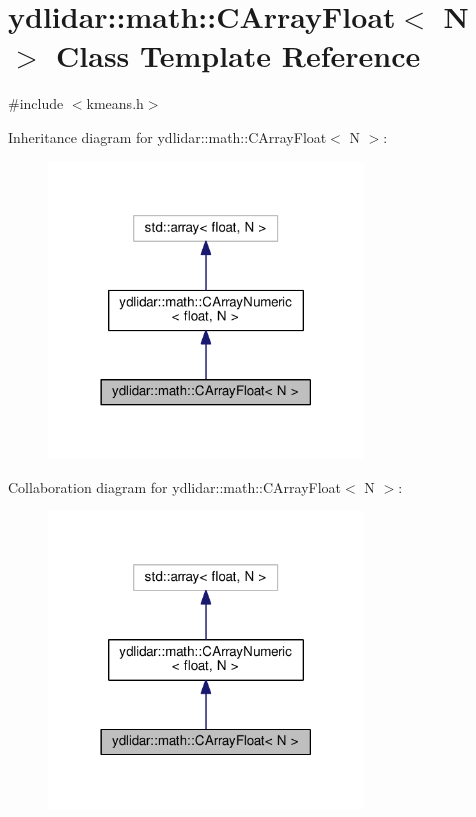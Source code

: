 \hypertarget{classydlidar_1_1math_1_1_c_array_float}{}\section{ydlidar\+:\+:math\+:\+:C\+Array\+Float$<$ N $>$ Class Template Reference}
\label{classydlidar_1_1math_1_1_c_array_float}


{\ttfamily \#include $<$kmeans.\+h$>$}



Inheritance diagram for ydlidar\+:\+:math\+:\+:C\+Array\+Float$<$ N $>$\+:
\nopagebreak
\begin{figure}[H]
\begin{center}
\leavevmode
\includegraphics[width=237pt]{classydlidar_1_1math_1_1_c_array_float__inherit__graph}
\end{center}
\end{figure}


Collaboration diagram for ydlidar\+:\+:math\+:\+:C\+Array\+Float$<$ N $>$\+:
\nopagebreak
\begin{figure}[H]
\begin{center}
\leavevmode
\includegraphics[width=237pt]{classydlidar_1_1math_1_1_c_array_float__coll__graph}
\end{center}
\end{figure}
